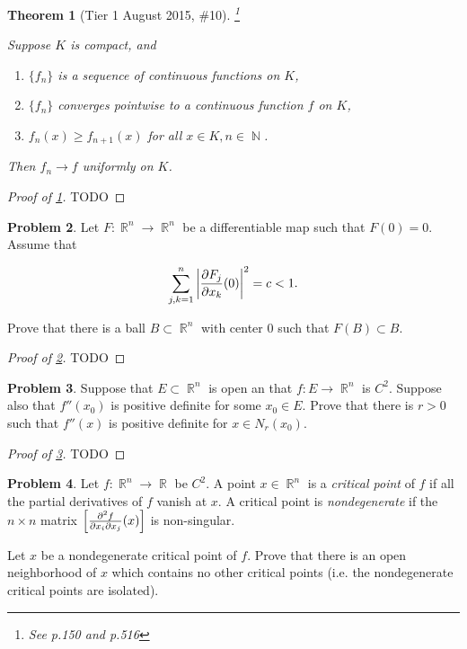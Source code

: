 \documentclass[english]{article}
\DeclareMathOperator{\R}{\mathbb{R}}
\DeclareMathOperator{\N}{\mathbb{N}}
\newtheorem{theorem}{Theorem} %
\theoremstyle{definition}
\newtheorem{problem}[theorem]{Problem}
\begin{document}
\begin{theorem}[Tier 1 August 2015, \#10] \footnote{See \cite{rudin} p.150 and p.516}
    \label{thm:unif_convergence}

    Suppose $K$ is compact, and 
    \begin{enumerate}
        \item \label{enum:thm:unif_convergence_1} $\{f_n\}$ is a sequence of continuous functions on $K$,
        \item \label{enum:thm:unif_convergence_2} $\{f_n\}$ converges pointwise to a continuous function $f$ on $K$,
        \item \label{enum:thm:unif_convergence_3} $f_n(x) \geq f_{n + 1}(x)$ for all $x \in K, n \in \N$.
    \end{enumerate}

    Then $f_n \to f$ uniformly on $K$.
\end{theorem}

\begin{proof}[Proof of \cref{thm:unif_convergence}]
    TODO
\end{proof}

\begin{problem}
    \label{prob:ball_at_origin}
    Let $F: \R^n \to \R^n$ be a differentiable map such that $F(0) = 0$. Assume that 

    \[
      \sum_{j, k = 1}^n \left| {\partial F_j \over \partial x_k} (0) \right|^2 = c < 1.
    \]

    Prove that there is a ball $B \subset \R^n$ with center 0 such that $F(B) \subset B$.
\end{problem}

\begin{proof}[Proof of \cref{prob:ball_at_origin}]
    TODO
\end{proof}

\begin{problem}
    \label{prob:small_ball}
    Suppose that $E \subset \R^n$ is open an that $f: E \to \R^n$ is $C^2$. Suppose also that $f''(x_0)$ is positive definite for some $x_0 \in E$. Prove that there is $r > 0$ such that $f''(x)$ is positive definite for $x \in N_r(x_0)$.
\end{problem}

\begin{proof}[Proof of \cref{prob:small_ball}]
    TODO
\end{proof}

\begin{problem}
    Let $f: \R^n \to \R$ be $C^2$. A point $x \in \R^n$ is a \textit{critical point} of $f$ if all the partial derivatives of $f$ vanish at $x$. A critical point is \textit{nondegenerate} if the $n \times n$ matrix $\left[ {\partial^2 f \over \partial x_i \partial x_j } (x) \right]$ is non-singular. 

    Let $x$ be a nondegenerate critical point of $f$. Prove that there is an open neighborhood of $x$ which contains no other critical points (i.e. the nondegenerate critical points are isolated).
\end{problem}
\end{document}
